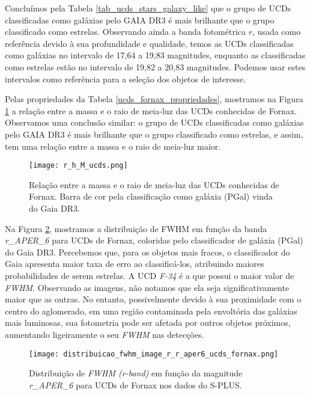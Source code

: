 Concluímos pela Tabela \ref{tab_ucds_stars_galaxy_like} que o grupo de UCDs classificadas como galáxias pelo GAIA DR3 é mais brilhante que o grupo classificado como estrelas. Observando ainda a banda fotométrica $r$, usada como referência devido à sua profundidade e qualidade, temos as UCDs classificadas como galáxias no intervalo de 17,64 a 19,83 magnitudes, enquanto as classificadas como estrelas estão no intervalo de 19,82 a 20,83 magnitudes. Podemos usar estes intervalos como referência para a seleção dos objetos de interesse.

Pelas propriedades da Tabela \ref{ucds_fornax_propriedades}, mostramos na Figura \ref{r_h_M_ucds} a relação entre a massa e o raio de meia-luz das UCDs conhecidas de Fornax. Observamos uma conclusão similar: o grupo de UCDs classificadas como galáxias pelo GAIA DR3 é mais brilhante que o grupo classificado como estrelas, e assim, tem uma relação entre a massa e o raio de meia-luz maior.

\begin{figure}[!ht]
    \centering
    \texttt{[image: r\_h\_M\_ucds.png]} 
    \caption[]{Relação entre a massa e o raio de meia-luz das UCDs conhecidas de Fornax. Barra de cor pela classificação como galáxia (PGal) vinda do Gaia DR3.}
    \label{r_h_M_ucds}
\end{figure}

Na Figura \ref{distribuicao_fwhm_image_r_r_aper6_ucds_fornax}, mostramos a distribuição de \ac{FWHM} em função da banda \textit{r\_APER\_6} para UCDs de Fornax, coloridas pelo classificador de galáxia (PGal) do Gaia DR3. Percebemos que, para os objetos mais fracos, o classificador do Gaia apresenta maior taxa de erro ao classificá-los, atribuindo maiores probabilidades de serem estrelas. A UCD \textit{F-34} é a que possui o maior valor de \textit{FWHM}. Observando as imagens, não notamos que ela seja significativamente maior que as outras. No entanto, possivelmente devido à sua proximidade com o centro do aglomerado, em uma região contaminada pela envoltória das galáxias mais luminosas, sua fotometria pode ser afetada por outros objetos próximos, aumentando ligeiramente o seu \textit{FWHM} nas detecções.

\begin{figure}[!ht]
    \centering
    \texttt{[image: distribuicao\_fwhm\_image\_r\_r\_aper6\_ucds\_fornax.png]}
    \caption[]{Distribuição de \textit{FWHM (r-band)} em função da magnitude \textit{r\_APER\_6} para UCDs de Fornax nos dados do S-PLUS.}
    \label{distribuicao_fwhm_image_r_r_aper6_ucds_fornax}
\end{figure}

